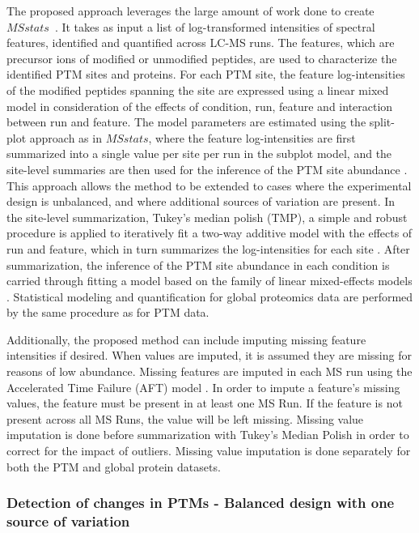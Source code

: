 \documentclass[mcp]{article}
\numberwithin{table}{section}
\begin{document}
The proposed approach leverages the large amount of work done to create $MSstats$~\cite{Choi:2014}. It takes as input a list of log-transformed intensities of spectral features, identified and quantified across LC-MS runs. The features, which are precursor ions of modified or unmodified peptides, are used to characterize the identified PTM sites and proteins. For each PTM site, the feature log-intensities of the modified peptides spanning the site are expressed using a linear mixed model in consideration of the effects of condition, run, feature and interaction between run and feature. The model parameters are estimated using the split-plot approach as in $MSstats$, where the feature log-intensities are first summarized into a single value per site per run in the subplot model, and the site-level summaries are then used for the inference of the PTM site abundance \cite{Choi:2014}. This approach allows the method to be extended to cases where the experimental design is unbalanced, and where additional sources of variation are present. In the site-level summarization, Tukey's median polish (TMP), a simple and robust procedure is applied to iteratively fit a two-way additive model with the effects of run and feature, which in turn summarizes the log-intensities for each site \cite{Tukey:1977}. After summarization, the inference of the PTM site abundance in each condition is carried through fitting a model based on the family of linear mixed-effects models \cite{Bolker2009} \cite{Faraway:2006}. Statistical modeling and quantification for global proteomics data are performed by the same procedure as for PTM data.

Additionally, the proposed method can include imputing missing feature intensities if desired. When values are imputed, it is assumed they are missing for reasons of low abundance. Missing features are imputed in each MS run using the Accelerated Time Failure (AFT) model \cite{Tukey:1977}. In order to impute a feature's missing values, the feature must be present in at least one MS Run. If the feature is not present across all MS Runs, the value will be left missing. Missing value imputation is done before summarization with Tukey's Median Polish in order to correct for the impact of outliers. Missing value imputation is done separately for both the PTM and global protein datasets.

\subsubsection*{Detection of changes in PTMs - Balanced design with one source of variation}
\label{sec:adjustment_summary}
\end{document}
